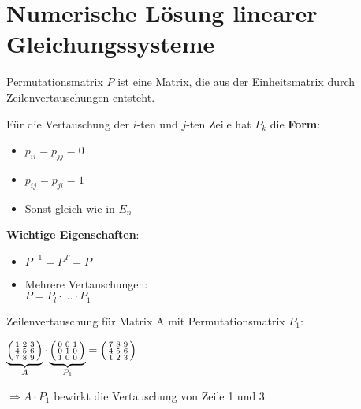 \section{Numerische Lösung linearer Gleichungssysteme}

\begin{concept}{Permutationsmatrix} $P$ ist eine Matrix, die aus der Einheitsmatrix durch Zeilenvertauschungen entsteht. 
    \vspace{1mm}\\
    \begin{minipage}[t]{0.5\textwidth}
        Für die Vertauschung der $i$-ten und $j$-ten Zeile hat $P_k$ die \textbf{Form}:
        \begin{itemize}
            \item $p_{ii} = p_{jj} = 0$ 
            \item $p_{ij} = p_{ji} = 1$
            \item Sonst gleich wie in $E_n$
        \end{itemize}
    \end{minipage}
    \hspace{3mm}
    \begin{minipage}[t]{0.45\textwidth}
        \vspace{1mm}
        \textbf{Wichtige Eigenschaften}:
        \begin{itemize}
            \item $P^{-1} = P^T = P$
            \item Mehrere Vertauschungen:\\ $P = P_l \cdot ... \cdot P_1$
        \end{itemize}
    \end{minipage}
\end{concept}

\begin{example2}{Zeilenvertauschung} für Matrix A mit Permutationsmatrix $P_1$:
    \vspace{1mm}\\
\begin{minipage}[t]{0.5\textwidth}
    $\underbrace{\begin{psmallmatrix}
    1 & 2 & 3\\
    4 & 5 & 6\\
    7 & 8 & 9
    \end{psmallmatrix}}_{A} \cdot 
    \underbrace{\begin{psmallmatrix}
    0 & 0 & 1\\
    0 & 1 & 0\\
    1 & 0 & 0
    \end{psmallmatrix}}_{P_1} =
    \begin{psmallmatrix}
    7 & 8 & 9\\
    4 & 5 & 6\\
    1 & 2 & 3
    \end{psmallmatrix}$
\end{minipage}
\begin{minipage}[t]{0.45\textwidth}
    \vspace{-2mm}
    $\Rightarrow A \cdot P_1$ bewirkt die Vertauschung von Zeile 1 und 3
\end{minipage}
\end{example2}

